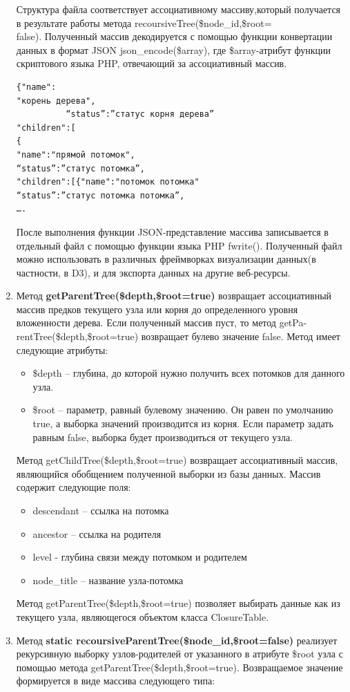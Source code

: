 \documentclass[a4paper,14pt]{extreport}
\theoremstyle{definition}
\begin{document}
\begin{enumerate}
Структура файла соответствует ассоциативному массиву,который получается в результате работы метода recoursiveTree(\$node\_id,\$root=\\false). Полученный массив декодируется с помощью функции конвертации данных в формат JSON json\_encode(\$array), где \$array-атрибут функции скриптового языка PHP, отвечающий за ассоциативный массив.
\begin{verbatim}{"name":
"корень дерева",
          “status”:”статус корня дерева”
"children":[
{
"name":"прямой потомок",
“status”:”статус потомка”,
"children":[{"name":"потомок потомка"
“status”:”статус потомка потомка”,
….\end{verbatim}
После выполнения функции JSON-представление массива записывается в отдельный файл с помощью функции языка PHP fwrite(). Полученный файл можно использовать в различных фреймворках визуализации данных(в частности, в D3), и для экспорта данных на другие веб-ресурсы.
\item Метод \textbf{getParentTree(\$depth,\$root=true)} возвращает ассоциативный массив предков текущего узла или корня до определенного уровня вложенности дерева. Если полученный массив пуст, то метод getPa-rentTree(\$depth,\$root=true) возвращает булево значение false.
Метод имеет следующие атрибуты:
\begin{itemize}
\item \$depth – глубина, до которой нужно получить всех потомков для данного узла.
\item \$root – параметр, равный булевому значению. Он равен по умолчанию true, а выборка значений производится из корня. Если параметр задать равным false, выборка будет производиться от текущего узла.
\end{itemize}
Метод getChildTree(\$depth,\$root=true) возвращает ассоциативный массив, являющийся обобщением полученной выборки из базы данных. Массив содержит следующие поля:
\begin{itemize}
\item descendant – ссылка на потомка
\item ancestor – ссылка на родителя
\item level - глубина связи между потомком и родителем
\item node\_title – название узла-потомка
\end{itemize}
Метод getParentTree(\$depth,\$root=true) позволяет выбирать данные как из текущего узла, являющегося объектом класса ClosureTable.
\item Метод \textbf{static recoursiveParentTree(\$node\_id,\$root=false)} реализует рекурсивную выборку узлов-родителей от указанного в атрибуте \$root узла с помощью метода getParentTree(\$depth,\$root=true). Возвращаемое значение формируется в виде массива следующего типа:

\end{enumerate}
\end{document}
